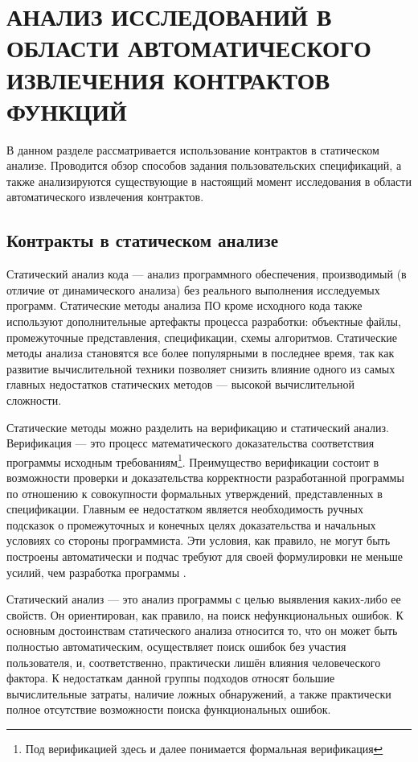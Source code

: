 \chapter{АНАЛИЗ ИССЛЕДОВАНИЙ В ОБЛАСТИ АВТОМАТИЧЕСКОГО ИЗВЛЕЧЕНИЯ КОНТРАКТОВ ФУНКЦИЙ}
\label{chapter:analysis}
В данном разделе рассматривается использование контрактов в статическом анализе. Проводится обзор способов задания пользовательских спецификаций, а также анализируются существующие в настоящий момент исследования в области автоматического извлечения контрактов.

\section{Контракты в статическом анализе}
Статический анализ кода --- анализ программного обеспечения, производимый (в отличие от динамического анализа) без реального выполнения исследуемых программ. Статические методы анализа ПО кроме исходного кода также используют дополнительные артефакты процесса разработки: объектные файлы, промежуточные представления, спецификации, схемы алгоритмов. Статические методы анализа становятся все более популярными в последнее время, так как развитие вычислительной техники позволяет снизить влияние одного из самых главных недостатков статических методов --- высокой вычислительной сложности.

Статические методы можно разделить на верификацию и статический анализ. Верификация --- это процесс математического доказательства соответствия программы исходным требованиям\footnote{Под верификацией здесь и далее понимается формальная верификация}. Преимущество верификации состоит в возможности проверки и доказательства корректности разработанной программы по отношению к совокупности формальных утверждений, представленных в спецификации. Главным ее недостатком является необходимость ручных подсказок о промежуточных и конечных целях доказательства и начальных условиях со стороны программиста. Эти условия, как правило, не могут быть построены автоматически и подчас требуют для своей формулировки не меньше усилий, чем разработка программы .

Статический анализ --- это анализ программы с целью выявления каких-либо ее свойств. Он ориентирован, как правило, на поиск нефункциональных ошибок. К основным достоинствам статического анали­за относится то, что он может быть полностью автоматическим, осуществляет поиск ошибок без участия пользователя, и, соответствен­но, практически лишён влияния человеческого фактора.  К недостаткам данной группы подходов относят большие вычислительные затраты, наличие ложных обнаружений, а также практически полное отсутствие возможности поиска функциональных ошибок.

